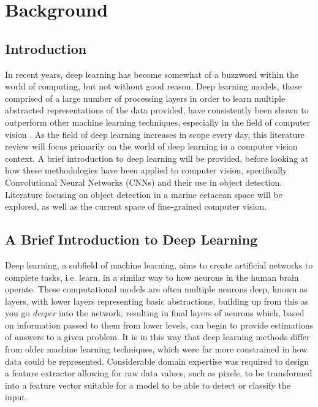\chapter{Background}\label{ch:Background}

\section{Introduction}\label{ch:Background,sec:Intro}

In recent years, deep learning has become somewhat of a buzzword within the world of computing, but not without good reason. Deep learning models, those comprised of a large number of processing layers in order to learn multiple abstracted representations of the data provided, have consistently been shown to outperform other machine learning techniques, especially in the field of computer vision \cite{lecun_deep_2015}. As the field of deep learning increases in scope every day, this literature review will focus primarily on the world of deep learning in a computer vision context. A brief introduction to deep learning will be provided, before looking at how these methodologies have been applied to computer vision, specifically Convolutional Neural Networks (CNNs) and their use in object detection. Literature focusing on object detection in a marine cetacean space will be explored, as well as the current space of fine-grained computer vision. 

\section{A Brief Introduction to Deep Learning}\label{ch:Background,sec:DLIntro}

Deep learning, a subfield of machine learning, aims to create artificial networks to complete tasks, i.e. learn, in a similar way to how neurons in the human brain operate. These computational models are often multiple neurons deep, known as layers, with lower layers representing basic abstractions, building up from this as you go \textit{deeper} into the network, resulting in final layers of neurons which, based on information passed to them from lower levels, can begin to provide estimations of answers to a given problem. It is in this way that deep learning methods differ from older machine learning techniques, which were far more constrained in how data could be represented. Considerable domain expertise was required to design a feature extractor allowing for raw data values, such as pixels, to be transformed into a feature vector suitable for a model to be able to detect or classify the input. 

